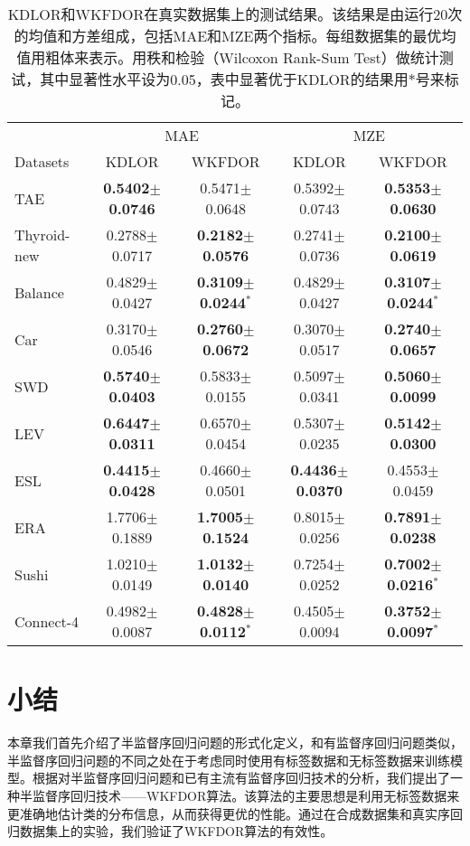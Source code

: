 \begin{table*}[!h]
\caption{KDLOR和WKFDOR在真实数据集上的测试结果。该结果是由运行20次的均值和方差组成，包括MAE和MZE两个指标。每组数据集的最优均值用粗体来表示。用秩和检验（Wilcoxon Rank-Sum Test）做统计测试，其中显著性水平设为0.05，表中显著优于KDLOR的结果用$*$号来标记。}
\label{table_realResults20m}
\centering
\begin{tabular}{l|cc|cc}
\toprule
 & \multicolumn {2}{c|}{MAE} & \multicolumn {2}{c}{MZE} \\
 \cmidrule {2-5}
Datasets & KDLOR & WKFDOR & KDLOR & WKFDOR\\
\midrule
TAE &  {\bf 0.5402$\pm$0.0746} &  0.5471$\pm$0.0648 & 0.5392$\pm$0.0743 & {\bf 0.5353$\pm$0.0630} \\
Thyroid-new & 0.2788$\pm$0.0717 &  {\bf 0.2182$\pm$0.0576} & 0.2741$\pm$0.0736 & {\bf 0.2100$\pm$0.0619} \\
Balance & 0.4829$\pm$0.0427 &  {\bf 0.3109$\pm$0.0244}$^{*}$ & 0.4829$\pm$0.0427 & {\bf 0.3107$\pm$0.0244}$^{*}$ \\
Car & 0.3170$\pm$0.0546 &  {\bf 0.2760$\pm$0.0672} & 0.3070$\pm$0.0517 & {\bf 0.2740$\pm$0.0657} \\
SWD & {\bf 0.5740$\pm$0.0403} &  0.5833$\pm$0.0155 & 0.5097$\pm$0.0341 & {\bf 0.5060$\pm$0.0099} \\
LEV & {\bf 0.6447$\pm$0.0311} &  0.6570$\pm$0.0454 & 0.5307$\pm$0.0235 & {\bf 0.5142$\pm$0.0300} \\
ESL & {\bf 0.4415$\pm$0.0428} &  0.4660$\pm$0.0501 & {\bf 0.4436$\pm$0.0370} & 0.4553$\pm$0.0459 \\
ERA & 1.7706$\pm$0.1889 &  {\bf 1.7005$\pm$0.1524} & 0.8015$\pm$0.0256 & {\bf 0.7891$\pm$0.0238} \\
Sushi & 1.0210$\pm$0.0149 & {\bf 1.0132$\pm$0.0140} & 0.7254$\pm$0.0252 & {\bf 0.7002$\pm$0.0216}$^{*}$ \\
Connect-4 & 0.4982$\pm$0.0087 & {\bf 0.4828$\pm$0.0112}$^{*}$ & 0.4505$\pm$0.0094 & {\bf 0.3752$\pm$0.0097}$^{*}$ \\
\bottomrule
\end{tabular}
\end{table*}

\section{小结}
本章我们首先介绍了半监督序回归问题的形式化定义，和有监督序回归问题类似，半监督序回归问题的不同之处在于考虑同时使用有标签数据和无标签数据来训练模型。根据对半监督序回归问题和已有主流有监督序回归技术的分析，我们提出了一种半监督序回归技术——WKFDOR算法。该算法的主要思想是利用无标签数据来更准确地估计类的分布信息，从而获得更优的性能。通过在合成数据集和真实序回归数据集上的实验，我们验证了WKFDOR算法的有效性。








